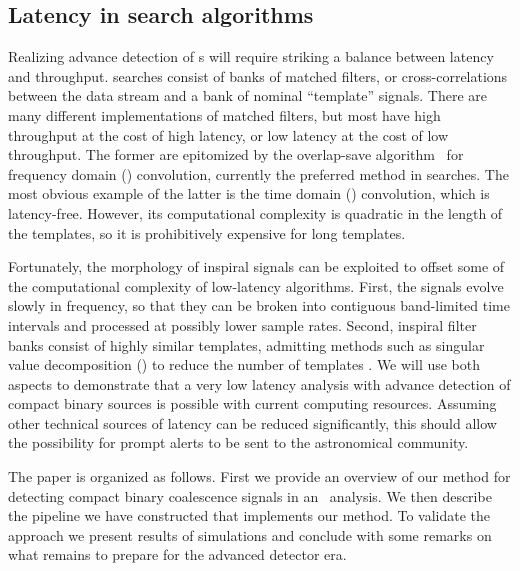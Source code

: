 \subsection{Latency in \CBC{} search algorithms}

Realizing advance detection of \CBC{}s will
require striking a balance between latency and throughput. \CBC{} searches
consist of banks of matched filters, or
cross-correlations between the data stream and a bank of nominal ``template''
signals.  There are many different implementations of matched filters, but most
have high throughput at the cost of high latency, or low latency at the cost of
low throughput.  The former are epitomized by the overlap-save algorithm~%
\citep{numerical-recipes-chapter-13} for frequency domain (\FD) convolution,
currently the preferred method in \GW{}
searches.  The most obvious example of the latter is the time domain
(\TD) convolution, which is latency-free.  However, its
computational complexity is quadratic in the length of the templates, so it is
prohibitively expensive for long templates.

Fortunately, the morphology of inspiral signals can be exploited to offset some
of the computational complexity of low-latency algorithms.  First, the signals
evolve slowly in frequency, so that they can be broken into contiguous
band-limited time intervals and processed at possibly lower sample rates.
Second, inspiral filter banks consist of highly similar templates, admitting
methods such as singular value decomposition (\SVD{}) to reduce the number of
templates \citep{Cannon:2010p10398}. We will use both aspects to demonstrate that a very
low latency analysis with advance detection of compact binary sources is
possible with current computing resources.  Assuming other technical sources of
latency can be reduced significantly, this should allow the possibility for
prompt alerts to be sent to the astronomical community.

The paper is organized as follows. First we provide an overview of our method
for detecting compact binary coalescence signals in an \earlywarning\ analysis.
We then describe the pipeline we have constructed that implements our method.
To validate the approach we present results of simulations and conclude with
some remarks on what remains to prepare for the advanced detector era.

